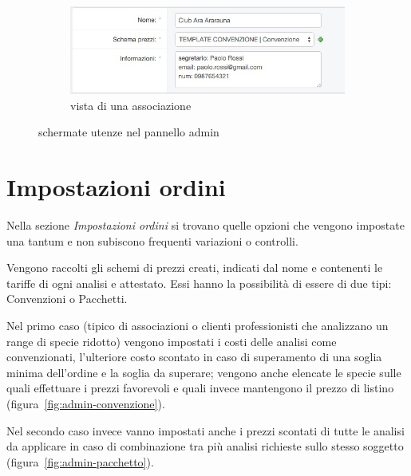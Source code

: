 \begin{figure}
\begin{subfigure}[b]{0.6\textwidth}
   \includegraphics[width=\textwidth]{images/admin-associazione}
   \caption{vista di una associazione}
   \label{fig:admin-associazione}
 \end{subfigure}
 \caption{schermate utenze nel pannello admin}
 \label{fig:admin-utenze}
\end{figure}

\section*{Impostazioni ordini}
Nella sezione \emph{Impostazioni ordini} si trovano quelle opzioni che vengono impostate una tantum e non subiscono frequenti variazioni o controlli.

Vengono raccolti gli \textsf{schemi di prezzi} creati, indicati dal nome e contenenti le tariffe di ogni analisi e attestato. Essi hanno la possibilità di essere di due tipi: Convenzioni o Pacchetti. 

Nel primo caso (tipico di associazioni o clienti professionisti che analizzano un range di specie ridotto) vengono impostati i costi delle analisi come convenzionati, l'ulteriore costo scontato in caso di superamento di una soglia minima dell'ordine e la soglia da superare; vengono anche elencate le specie sulle quali effettuare i prezzi favorevoli e quali invece mantengono il prezzo di listino (figura~\ref{fig:admin-convenzione}).

Nel secondo caso invece vanno impostati anche i prezzi scontati di tutte le analisi da applicare in caso di combinazione tra più analisi richieste sullo stesso soggetto (figura~\ref{fig:admin-pacchetto}).

